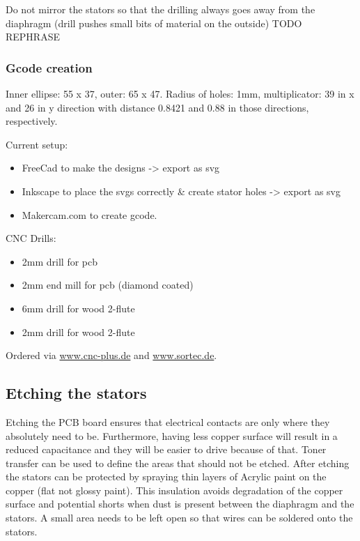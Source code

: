 \documentclass{article}
\begin{document}
Do not mirror the stators so that the drilling always goes away from the diaphragm (drill pushes small bits of material on the outside) TODO REPHRASE

\subsubsection{Gcode creation}
\label{s:driver:design:gcode}
Inner ellipse: 55 x 37, outer: 65 x 47. Radius of holes: 1mm, multiplicator: 39 in x and 26 in y direction with distance 0.8421 and 0.88 in those directions, respectively.

Current setup:

\begin{itemize}
    \item FreeCad to make the designs -> export as svg
    \item Inkscape to place the svgs correctly \& create stator holes -> export as svg
    \item Makercam.com to create gcode.
\end{itemize}

CNC Drills:

\begin{itemize}
    \item 2mm drill for pcb
    \item 2mm end mill for pcb (diamond coated)
    \item 6mm drill for wood 2-flute
    \item 2mm drill for wood 2-flute
\end{itemize}

Ordered via \url{www.cnc-plus.de} and \url{www.sortec.de}.

\subsection{Etching the stators}
\label{s:driver:etching}
Etching the PCB board ensures that electrical contacts are only where they absolutely need to be. Furthermore, having less copper surface will result in a reduced capacitance and they will be easier to drive because of that. Toner transfer can be used to define the areas that should not be etched. After etching the stators can be protected by spraying thin layers of Acrylic paint on the copper (flat not glossy paint). This insulation avoids degradation of the copper surface and potential shorts when dust is present between the diaphragm and the stators. A small area needs to be left open so that wires can be soldered onto the stators.
\end{document}

